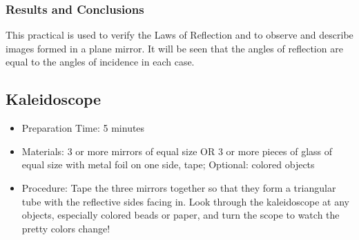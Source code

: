 \subsubsection*{Results and Conclusions}
This practical is used to verify the Laws of Reflection and to observe and describe images formed in a plane mirror.  It will be seen that the angles of reflection are equal to the angles of incidence in each case.





\subsection{Kaleidoscope}
\begin{itemize}
\item{Preparation Time: 5 minutes}
\item{Materials: 3 or more mirrors of equal size OR 3 or more pieces of glass of equal size with metal foil on one side, tape; Optional: colored objects}
\item{Procedure: Tape the three mirrors together so that they form a triangular tube with the reflective sides facing in. Look through the kaleidoscope at any objects, especially colored beads or paper, and turn the scope to watch the pretty colors change!}
\end{itemize}